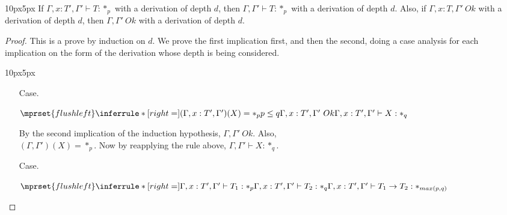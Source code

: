 \begin{lemma}
  \begin{changemargin}{10px}{5px}\noindent
  If $\Gamma,x:T',\Gamma' \vdash T:*_p$ with a derivation of depth $d$, then 
  $\Gamma,\Gamma' \vdash T:*_p$ with a derivation of depth $d$.  Also, if 
  $\Gamma,x:T,\Gamma'\ Ok$ with a 
  derivation of depth $d$, then $\Gamma,\Gamma'\ Ok$ with a derivation of depth $d$.
  \label{lemma:context_strengthening_for_kinding_ssf}
  \end{changemargin}
\end{lemma}
\begin{proof}
  This is a prove by induction on $d$.  We prove the first implication first, and then the 
  second, doing a case analysis for each implication on the form of the derivation whose depth 
  is being considered.
  \vspace{-25px}
  \begin{changemargin}{10px}{5px}\noindent
  \begin{itemize}
  \item[Case.]\ \\
    \begin{center}
      \begin{math}
        $$\mprset{flushleft}
        \inferrule* [right=] {
          (\Gamma,x:T',\Gamma')(X) = *_p
          \\
          p \leq q
          \\
          \Gamma,x:T',\Gamma'\ Ok
        }{\Gamma,x:T',\Gamma' \vdash X : *_q}
      \end{math}
    \end{center}
    
    By the second implication of the induction hypothesis, $\Gamma,\Gamma'\ Ok$. Also, \\
    $(\Gamma,\Gamma')(X) = *_p$.  Now by reapplying the rule above, 
    $\Gamma,\Gamma' \vdash X:*_q$.
    
  \item[Case.]\ \\
    \begin{center}
      \begin{math}
        $$\mprset{flushleft}
        \inferrule* [right=] {
          \Gamma,x:T',\Gamma' \vdash T_1 : *_p
          \\
          \Gamma,x:T',\Gamma' \vdash T_2 : *_q
        }{\Gamma,x:T',\Gamma' \vdash T_1 \rightarrow T_2 : *_{max(p,q)}}
      \end{math}
    \end{center}
    

\end{itemize}
\end{changemargin}
\end{proof}
